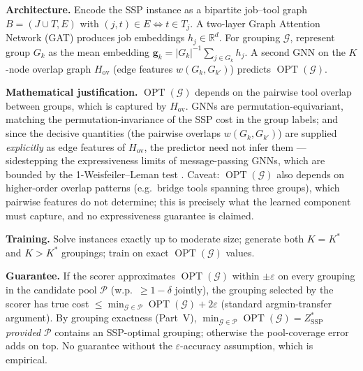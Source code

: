 \documentclass[11pt,a4paper]{article}
\theoremstyle{plain}
\theoremstyle{definition}
\DeclareMathOperator{\OPT}{OPT}
\newcommand{\Kstar}{K^*}
\newcommand{\calG}{\mathcal{G}}
\newcommand{\ZSSP}{Z_{\mathrm{SSP}}^*}
\begin{document}
\noindent\textbf{Architecture.}
Encode the SSP instance as a bipartite job--tool graph $B = (J \cup T, E)$
with $(j,t) \in E \iff t \in T_j$.
A two-layer Graph Attention Network (GAT) produces job embeddings
$h_j \in \mathbb{R}^d$. For grouping $\calG$, represent group $G_k$ as the mean
embedding $\mathbf{g}_k = |G_k|^{-1}\sum_{j \in G_k} h_j$.
A second GNN on the $K$-node overlap graph $H_\mathrm{ov}$ (edge features
$w(G_k,G_{k'})$) predicts $\OPT(\calG)$.

\noindent\textbf{Mathematical justification.}
$\OPT(\calG)$ depends on the pairwise tool overlap between groups, which is
captured by $H_\mathrm{ov}$.
GNNs are permutation-equivariant, matching the permutation-invariance of the
SSP cost in the group labels; and since the decisive quantities (the pairwise
overlaps $w(G_k,G_{k'})$) are supplied \emph{explicitly} as edge features of
$H_\mathrm{ov}$, the predictor need not infer them --- sidestepping the
expressiveness limits of message-passing GNNs, which are bounded by the
1-Weisfeiler--Leman test \cite{Xu2019}. Caveat: $\OPT(\calG)$ also depends on
higher-order overlap patterns (e.g.\ bridge tools spanning three groups), which
pairwise features do not determine; this is precisely what the learned component
must capture, and no expressiveness guarantee is claimed.

\noindent\textbf{Training.} Solve instances exactly up to moderate size;
generate both $K=\Kstar$ and $K>\Kstar$ groupings; train on exact $\OPT(\calG)$ values.

\noindent\textbf{Guarantee.}
If the scorer approximates $\OPT(\calG)$ within $\pm\varepsilon$ on every
grouping in the candidate pool $\mathcal{P}$ (w.p.\ $\ge1-\delta$ jointly), the
grouping selected by the scorer has true cost
$\le \min_{\calG\in\mathcal{P}}\OPT(\calG) + 2\varepsilon$
(standard argmin-transfer argument). By grouping exactness (Part~V),
$\min_{\calG\in\mathcal{P}}\OPT(\calG)=\ZSSP$ \emph{provided} $\mathcal{P}$
contains an SSP-optimal grouping; otherwise the pool-coverage error adds on
top. No guarantee without the $\varepsilon$-accuracy assumption, which is
empirical.
\end{document}
